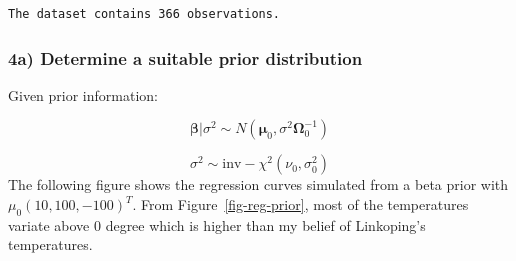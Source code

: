 \documentclass[
  letterpaper,
  DIV=11,
  numbers=noendperiod]{scrartcl}
\begin{document}
\begin{verbatim}
The dataset contains 366 observations.
\end{verbatim}

\subsubsection{4a) Determine a suitable prior
distribution}\label{a-determine-a-suitable-prior-distribution}

Given prior information:

\[
\boldsymbol{\beta} \vert \sigma^2 \sim N(\boldsymbol{\mu}_0,\sigma^2\boldsymbol{\Omega}_0^{-1}) 
\]

\[
\sigma^2 \sim \mathrm{inv-}\chi^2(\nu_0, \sigma_0^2)
\] The following figure shows the regression curves simulated from a
beta prior with \(\mu_0 (10, 100, -100)^T\). From
Figure~\ref{fig-reg-prior}, most of the temperatures variate above 0
degree which is higher than my belief of Linkoping's temperatures.
\end{document}
